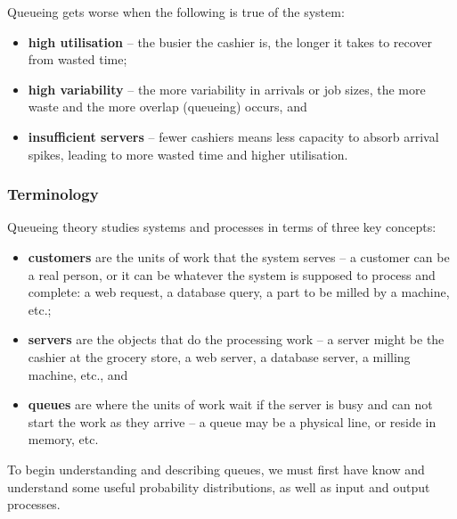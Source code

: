 \newl Queueing gets worse when the following is true of the system:
\begin{itemize}[noitemsep]
\item \textbf{high utilisation} -- the busier the cashier is, the longer it takes to recover from wasted time; 
\item \textbf{high variability} -- the more variability in arrivals or job sizes, the more waste and the more overlap (queueing) occurs, and 
\item \textbf{insufficient servers} -- fewer cashiers means less capacity to absorb arrival spikes, leading to more wasted time and higher utilisation.
\end{itemize}


\subsubsection{Terminology}
Queueing theory studies systems and processes in terms of three key concepts:
\begin{itemize}[noitemsep]
\item \textbf{customers} are the units of work that the system serves -- a customer can be a real person, or it can be whatever the system is supposed to process and complete: a web request, a database query, a part to be milled by a machine, etc.;
\item \textbf{servers} are the objects that do the processing work -- a server might be the cashier at the grocery store, a web server, a database server, a milling machine, etc., and 
\item \textbf{queues} are where the units of work wait if the server is busy and can not start the work as they arrive -- a queue may be a physical line, or reside in memory, etc. 
\end{itemize}
To begin understanding and describing queues, we must first have know and understand some useful probability distributions, as well as input and output processes.
